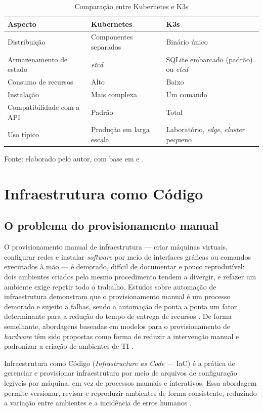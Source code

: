 \begin{table}[htb]
    \centering
    \caption{Comparação entre Kubernetes e K3s}
    \label{tab:k8s_vs_k3s}
    \begin{tabularx}{\textwidth}{|l|X|X|}
        \hline
        \textbf{Aspecto} & \textbf{Kubernetes} & \textbf{K3s} \\ \hline
        Distribuição & Componentes separados & Binário único \\ \hline
        Armazenamento de estado & \textit{etcd} & SQLite embarcado (padrão) ou \textit{etcd} \\ \hline
        Consumo de recursos & Alto & Baixo \\ \hline
        Instalação & Mais complexa & Um comando \\ \hline
        Compatibilidade com a API & Padrão & Total \\ \hline
        Uso típico & Produção em larga escala & Laboratório, \textit{edge}, \textit{cluster} pequeno \\ \hline
    \end{tabularx}
    \par\small Fonte: elaborado pelo autor, com base em \cite{kubernetesDocs:online} e \cite{k3sDocs:online}.
\end{table}


\section{Infraestrutura como Código}
\label{sec:iac}

\subsection{O problema do provisionamento manual}

\par O provisionamento manual de infraestrutura — criar máquinas virtuais, configurar redes e instalar \textit{software} por meio de interfaces gráficas ou comandos executados à mão — é demorado, difícil de documentar e pouco reprodutível: dois ambientes criados pelo mesmo procedimento tendem a divergir, e refazer um ambiente exige repetir todo o trabalho. Estudos sobre automação de infraestrutura demonstram que o provisionamento manual é um processo demorado e sujeito a falhas, sendo a automação de ponta a ponta um fator determinante para a redução do tempo de entrega de recursos \cite{Sandobalín}. De forma semelhante, abordagens baseadas em modelos para o provisionamento de \textit{hardware} têm sido propostas como forma de reduzir a intervenção manual e padronizar a criação de ambientes de TI \cite{Gokhale}.\\
\par Infraestrutura como Código (\textit{Infrastructure as Code} — IaC) é a prática de gerenciar e provisionar infraestrutura por meio de arquivos de configuração legíveis por máquina, em vez de processos manuais e interativos. Essa abordagem permite versionar, revisar e reproduzir ambientes de forma consistente, reduzindo a variação entre ambientes e a incidência de erros humanos \cite{KunalBhandari}.

